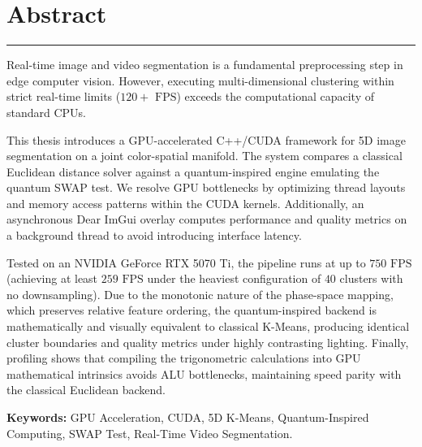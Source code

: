 \chapter*{Abstract}
\vspace{0.5cm}
\hrule
\vspace{0.5cm}

Real-time image and video segmentation is a fundamental preprocessing step in edge computer vision. However, executing multi-dimensional clustering within strict real-time limits ($120+\text{ FPS}$) exceeds the computational capacity of standard CPUs.

This thesis introduces a GPU-accelerated C++/CUDA framework for 5D image segmentation on a joint color-spatial manifold. The system compares a classical Euclidean distance solver against a quantum-inspired engine emulating the quantum SWAP test. We resolve GPU bottlenecks by optimizing thread layouts and memory access patterns within the CUDA kernels. Additionally, an asynchronous Dear ImGui overlay computes performance and quality metrics on a background thread to avoid introducing interface latency.

Tested on an NVIDIA GeForce RTX 5070 Ti, the pipeline runs at up to $750\text{ FPS}$ (achieving at least $259\text{ FPS}$ under the heaviest configuration of $40$ clusters with no downsampling). Due to the monotonic nature of the phase-space mapping, which preserves relative feature ordering, the quantum-inspired backend is mathematically and visually equivalent to classical K-Means, producing identical cluster boundaries and quality metrics under highly contrasting lighting. Finally, profiling shows that compiling the trigonometric calculations into GPU mathematical intrinsics avoids ALU bottlenecks, maintaining speed parity with the classical Euclidean backend.

\vspace{1.5cm}
\noindent \textbf{Keywords:} GPU Acceleration, CUDA, 5D K-Means, Quantum-Inspired Computing, SWAP Test, Real-Time Video Segmentation.